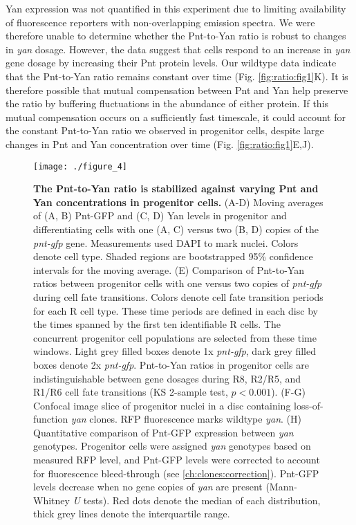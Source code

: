 Yan expression was not quantified in this experiment due to limiting availability of fluorescence reporters with non-overlapping emission spectra. We were therefore unable to determine whether the Pnt-to-Yan ratio is robust to changes in \textit{yan} dosage. However, the data suggest that cells respond to an increase in \textit{yan} gene dosage by increasing their Pnt protein levels. Our wildtype data indicate that the Pnt-to-Yan ratio remains constant over time (Fig. \ref{fig:ratio:fig1}K). It is therefore possible that mutual compensation between Pnt and Yan help preserve the ratio by buffering fluctuations in the abundance of either protein. If this mutual compensation occurs on a sufficiently fast timescale, it could account for the constant Pnt-to-Yan ratio we observed in progenitor cells, despite large changes in Pnt and Yan concentration over time (Fig. \ref{fig:ratio:fig1}E,J).

\begin{figure}[!h]
\centering
\texttt{[image: ./figure\_4]}
\caption[P:Y ratio is stabilized against varying Pnt and Yan concentrations.]{\textbf{The Pnt-to-Yan ratio is stabilized against varying Pnt and Yan concentrations in progenitor cells.} (A-D) Moving averages of (A, B) Pnt-GFP and (C, D) Yan levels in progenitor and differentiating cells with one (A, C) versus two (B, D) copies of the \textit{pnt-gfp} gene. Measurements used DAPI to mark nuclei. Colors denote cell type. Shaded regions are bootstrapped 95\% confidence intervals for the moving average. (E) Comparison of Pnt-to-Yan ratios between progenitor cells with one versus two copies of \textit{pnt-gfp} during cell fate transitions. Colors denote cell fate transition periods for each R cell type. These time periods are defined in each disc by the times spanned by the first ten identifiable R cells. The concurrent progenitor cell populations are selected from these time windows. Light grey filled boxes denote 1x \textit{pnt-gfp}, dark grey filled boxes denote 2x \textit{pnt-gfp}. Pnt-to-Yan ratios in progenitor cells are indistinguishable between gene dosages during R8, R2/R5, and R1/R6 cell fate transitions (KS 2-sample test, $p<0.001$). (F-G) Confocal image slice of progenitor nuclei in a disc containing loss-of-function \textit{yan} clones. RFP fluorescence marks wildtype \textit{yan}. (H) Quantitative comparison of Pnt-GFP expression between \textit{yan} genotypes. Progenitor cells were assigned \textit{yan} genotypes based on measured RFP level, and Pnt-GFP levels were corrected to account for fluorescence bleed-through (see \ref{ch:clones:correction}). Pnt-GFP levels decrease when no gene copies of \textit{yan} are present (Mann-Whitney \textit{U} tests). Red dots denote the median of each distribution, thick grey lines denote the interquartile range.}
\label{fig:ratio:fig4}
\end{figure}

